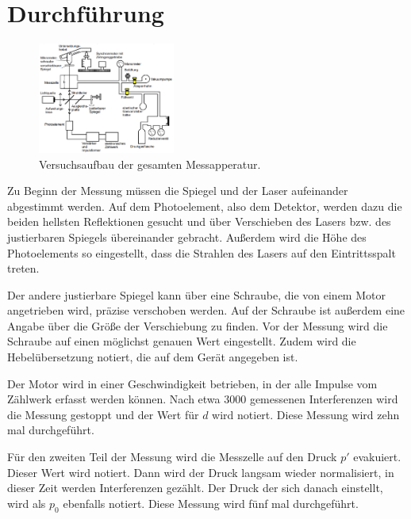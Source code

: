 \section{Durchführung}
\label{sec:Durchführung}


\begin{figure}
    \centering
    \includegraphics[width=0.4\textwidth]{images/bild4.png}
    \caption{Versuchsaufbau der gesamten Messapperatur.\cite{V401}}
    \label{fig:bild4}
\end{figure}

Zu Beginn der Messung müssen die Spiegel und der Laser aufeinander abgestimmt werden. 
Auf dem Photoelement, also dem Detektor, werden dazu die beiden hellsten Reflektionen gesucht und über Verschieben des Lasers bzw. des justierbaren Spiegels übereinander gebracht.
Außerdem wird die Höhe des Photoelements so eingestellt, dass die Strahlen des Lasers auf den Eintrittsspalt treten.

Der andere justierbare Spiegel kann über eine Schraube, die von einem Motor angetrieben wird, präzise verschoben werden.
Auf der Schraube ist außerdem eine Angabe über die Größe der Verschiebung zu finden.
Vor der Messung wird die Schraube auf einen möglichst genauen Wert eingestellt.
Zudem wird die Hebelübersetzung notiert, die auf dem Gerät angegeben ist. 

Der Motor wird in einer Geschwindigkeit betrieben, in der alle Impulse vom Zählwerk erfasst werden können. 
Nach etwa 3000 gemessenen Interferenzen wird die Messung gestoppt und der Wert für $d$ wird notiert. 
Diese Messung wird zehn mal durchgeführt.

Für den zweiten Teil der Messung wird die Messzelle auf den Druck $p'$ evakuiert. 
Dieser Wert wird notiert.
Dann wird der Druck langsam wieder normalisiert, in dieser Zeit werden Interferenzen gezählt.
Der Druck der sich danach einstellt, wird als $p_0$ ebenfalls notiert.
Diese Messung wird fünf mal durchgeführt.